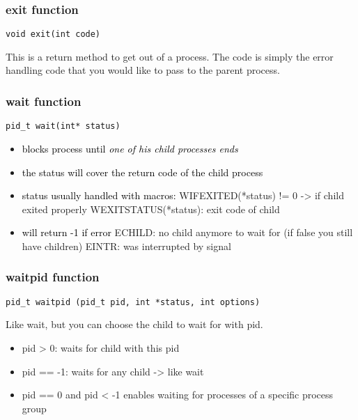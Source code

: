 \documentclass[main.tex,fontsize=8pt,paper=a4,paper=portrait,DIV=calc,]{scrartcl}
\begin{document}
\subsubsection{exit function}
\begin{lstlisting}
void exit(int code)
\end{lstlisting}
This is a return method to get out of a process.\newline
The code is simply the error handling code that you would like to pass to the parent process.

\subsubsection{wait function}
\begin{lstlisting}
pid_t wait(int* status)
\end{lstlisting}
\begin{itemize}
  \item \textcolor{black}{blocks process until \emph{one of his child processes ends}}
\item \textcolor{black}{the status will cover the return code of the child process}
\item \textcolor{black}{status usually handled with macros:}\newline
  WIFEXITED(*status) != 0 -> if child exited properly \newline
  WEXITSTATUS(*status): exit code of child
\item \textcolor{black}{will return -1 if error}\nelwine
  ECHILD: no child anymore to wait for (if false you still have children)\newline
  EINTR: was interrupted by signal
\end{itemize} 

\subsubsection{waitpid function}
\begin{lstlisting}
pid_t waitpid (pid_t pid, int *status, int options)
\end{lstlisting}
Like wait, but you can choose the child to wait for with pid.
\begin{itemize}
\item \textcolor{color}{pid > 0: waits for child with this pid}
\item \textcolor{color}{pid == -1: waits for any child -> like wait}
\item \textcolor{color}{pid == 0 and pid < -1 enables waiting for processes of a specific process group}
\end{itemize} 
\end{document}

